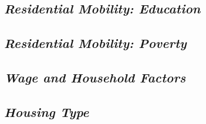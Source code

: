 


\subsection{\textit{Residential Mobility: Education}}



\subsection{\textit{Residential Mobility: Poverty}}



\subsection{\textit{Wage and Household Factors}}



\subsection{\textit{Housing Type}}


